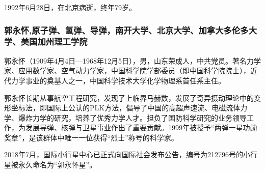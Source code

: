 \documentclass[UTF8]{ctexart}
\begin{document}
1992年6月28日，在北京病逝，终年79岁。

    \subsubsection{郭永怀,原子弹、氢弹、导弹，南开大学、北京大学、加拿大多伦多大学、美国加州理工学院}
郭永怀（1909年4月4日—1968年12月5日），男，山东荣成人，中共党员。著名力学家、应用数学家、空气动力学家，中国科学院学部委员（即中国科学院院士），近代力学事业的奠基人之一，中国科学技术大学化学物理系首任系主任。 

郭永怀长期从事航空工程研究，发现了上临界马赫数，发展了奇异摄动理论中的变形坐标法，即国际上公认的PLK方法，倡导了中国的高超声速流、电磁流体力学、爆炸力学的研究，培养了优秀力学人才。担负了国防科学研究的业务领导工作，为发展导弹、核弹与卫星事业作出了重要贡献。1999年被授予“两弹一星功勋奖章”，是该群体中唯一一位获得“烈士”称号的科学家。 

2018年7月，国际小行星中心已正式向国际社会发布公告，编号为212796号的小行星被永久命名为“郭永怀星”。
    
    
    
\end{document}

